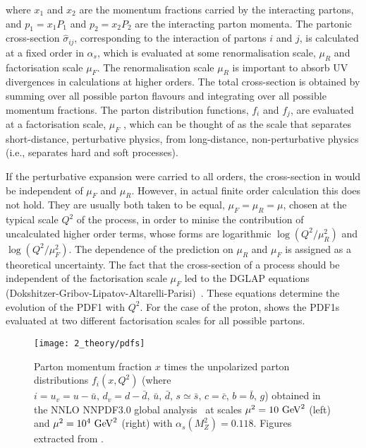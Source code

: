 where \(x_1\) and \(x_2\) are the momentum fractions carried by the interacting partons, and \(p_1 = x_1 P_1\) and \(p_2 = x_2 P_2\) are the interacting parton momenta. The partonic cross-section \(\hat{\sigma}_{ij}\), corresponding to the interaction of partons \(i\) and \(j\), is calculated at a fixed order in \(\alpha_s\), which is evaluated at some renormalisation scale, \(\mu_R\) and factorisation scale \(\mu_F\). The renormalisation scale \(\mu_R\) is important to absorb \ac{UV} divergences in calculations at higher orders. The total cross-section is obtained by summing over all possible parton flavours and integrating over all possible momentum fractions. The parton distribution functions, \(f_i\) and \(f_j\), are evaluated at a factorisation scale, \(\mu_F\) , which can be thought of as the scale that separates short-distance, perturbative physics, from long-distance, non-perturbative physics (i.e., separates hard and soft processes).

If the perturbative expansion were carried to all orders, the cross-section in \Eqn{\ref{eq:theory:sm:hadron_interactions:xs}} would be independent of \(\mu_F\) and \(\mu_R\). However, in actual finite order calculation this does not hold. They are usually both taken to be equal, \(\mu_F = \mu_R = \mu\), chosen at the typical scale \(Q^2\) of the process, in order to minise the contribution of uncalculated higher order terms, whose forms are logarithmic \(\log\left(Q^2/\mu_R^2\right)\) and \(\log\left(Q^2/\mu_F^2\right)\). The dependence of the prediction on \(\mu_R\) and \(\mu_F\) is assigned as a theoretical uncertainty. The fact that the cross-section of a process should be independent of the factorisation scale \(\mu_F\) led to the DGLAP equations (Dokshitzer-Gribov-Lipatov-Altarelli-Parisi)~\cite{Dokshitzer-1977,Gribov_Lipatov-1971,Altarelli_Parisi-1977}. These equations determine the evolution of the \ac{PDF1} with \(Q^2\).
For the case of the proton, \Fig{\ref{fig:theory:sm:hadron_interactions:pdfs}} shows the \acp{PDF1} evaluated at two different factorisation scales for all possible partons.

\begin{figure}[ht!]
    \centering
    \texttt{[image: 2\_theory/pdfs]}
    \caption{Parton momentum fraction \(x\) times the unpolarized parton distributions \(f_i(x, Q^2)\) (where \(i = u_v = u - \bar{u}, \, d_v = d - \bar{d},\, \bar{u},\, \bar{d},\, s\simeq\bar{s},\, c=\bar{c},\, b=\bar{b},\, g \)) obtained in the NNLO NNPDF3.0 global analysis~\cite{NNPDF} at scales \(\mu^2 = 10~\text{GeV}^2\) (left) and \(\mu^2 = 10^4~\text{GeV}^2\) (right) with \(\alpha_s(M_Z^2) = 0.118\). Figures extracted from .}
    \label{fig:theory:sm:hadron_interactions:pdfs}
\end{figure}




